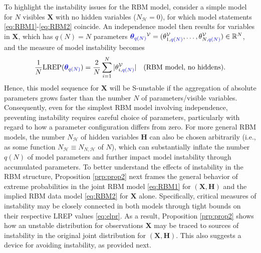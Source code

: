 \documentclass[numbib]{imamat}
\theoremstyle{theorem}
\theoremstyle{lemma}
\theoremstyle{example}
\theoremstyle{corollary}
\theoremstyle{definition}
\theoremstyle{remark}
\theoremstyle{approximation}
\theoremstyle{scheme}
\newcommand{\REP}{\mathrm{LREP}}
\newcommand{\thetaidx}{q(N)}
\newcommand{\thetaN}{\boldsymbol \theta_{\thetaidx}}
\newcommand{\ak}[1]{{\color{blue} #1}}
\begin{document}
To highlight the instability issues for the RBM model, consider a simple model for \(N\) visibles \(\boldsymbol X\) with no hidden variables (\(N_{\mathcal{H}}=0\)), for which model statements \eqref{eq:RBM1}-\eqref{eq:RBM2} coincide. An independence model then results for variables in \(\boldsymbol X\), which has \(q(N)=N\) parameters \(\ak{\thetaN}^{\mathcal{V}} = (\theta_{1,\ak{\thetaidx}}^{\mathcal{V}}, \ldots, \theta_{N,\ak{\thetaidx}}^{\mathcal{V}}) \in \mathbb{R}^{N}\), and the measure of model instability becomes
\[
\frac{1}{N}\REP(\ak{\thetaN}) = \frac{2}{N} \sum_{i=1}^N|\theta_{i,\ak{\thetaidx}}^{\mathcal{V}}| \quad \text{(RBM model, no hiddens)}.
\]
Hence, this model sequence for \(\boldsymbol X\) will be S-unstable if the aggregation of absolute parameters grows faster than the number \(N\) of parameters/visible variables. Consequently, even for \ak{the} simplest RBM model involving independence, preventing instability requires careful choice of parameters, particularly with regard to how a parameter configuration differs from zero. For more general RBM models, the number \(N_{\mathcal{H}}\) of hidden variables \(\boldsymbol H\) can also be chosen arbitrarily (i.e., as some function \(N_{\mathcal{H}}\equiv N_{N,\mathcal{H}}\) of \(N\)), which can substantially inflate the number \(q(N)\) of model parameters and further impact model instability through accumulated parameters. To better understand the effects of instability in the RBM structure, Proposition \ref{prp:prop2} next frames the general behavior of extreme probabilities in the joint RBM model \eqref{eq:RBM1} for \((\boldsymbol X, \boldsymbol H)\) and the implied RBM data model \eqref{eq:RBM2} for \(\boldsymbol X\) alone. Specifically, critical measures of instability may be closely connected in both models through tight bounds on their respective LREP values \eqref{eq:elpr}. As a result, Proposition \ref{prp:prop2} shows how an unstable distribution for observations \(\boldsymbol X\) may be traced to sources of instability in the original joint distribution for \((\boldsymbol X,\boldsymbol H)\). This also suggests a device for avoiding instability, as provided next.
\end{document}

